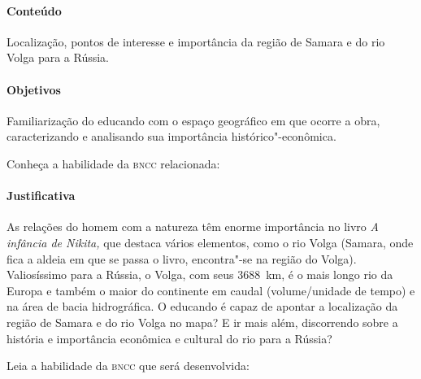 \documentclass[11pt]{extarticle}
\begin{document}
\paragraph{Conteúdo}
Localização, pontos de interesse e importância da região de Samara e do
rio Volga para a Rússia.

\paragraph{Objetivos}
Familiarização do educando com o espaço geográfico em que ocorre a obra,
caracterizando e analisando sua importância histórico"-econômica.

Conheça a habilidade da \textsc{bncc} relacionada:


\paragraph{Justificativa}
As relações do homem com a natureza têm enorme importância no livro
\emph{A infância de Nikita,} que destaca vários elementos, como o rio
Volga (Samara, onde fica a aldeia em que se passa o livro, encontra"-se na
região do Volga). Valiosíssimo para a Rússia, o Volga, com seus 3688~km,
é o mais longo rio da Europa e também o maior do
continente em caudal (volume/unidade de tempo) e na área de bacia
hidrográfica. O educando é capaz de apontar a localização da região de
Samara e do rio Volga no mapa? E ir mais além, discorrendo sobre a
história e importância econômica e cultural do rio para a Rússia?


Leia a habilidade da \textsc{bncc} que será desenvolvida:

\end{document}
